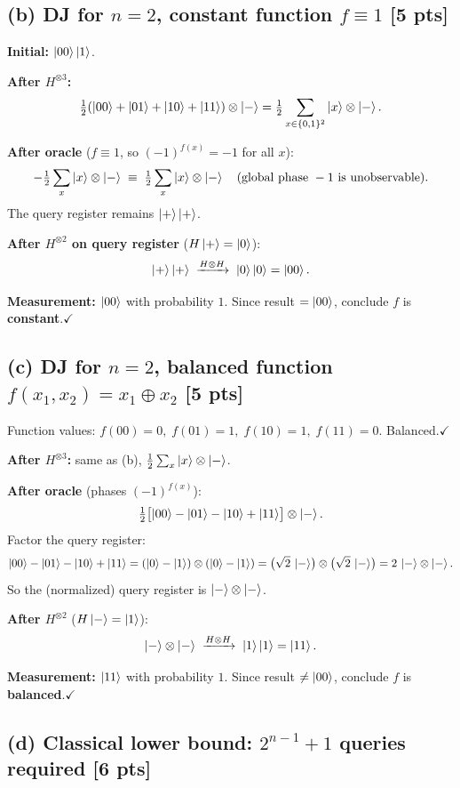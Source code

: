 \documentclass[11pt,a4paper]{article}
\begin{document}
\subsection*{(b) DJ for $n=2$, constant function $f\equiv1$ [5 pts]}

\textbf{Initial:} $\ket{00}\ket{1}$.

\textbf{After $H^{\otimes3}$:}
\[
\tfrac{1}{2}(\ket{00}+\ket{01}+\ket{10}+\ket{11})\otimes\ket{-}
=\tfrac{1}{2}\sum_{x\in\{0,1\}^2}\ket{x}\otimes\ket{-}.
\]

\textbf{After oracle} ($f\equiv1$, so $(-1)^{f(x)}=-1$ for all $x$):
\[
-\tfrac{1}{2}\sum_x\ket{x}\otimes\ket{-}\;\equiv\;\tfrac{1}{2}\sum_x\ket{x}\otimes\ket{-}
\quad(\text{global phase }-1\text{ is unobservable}).
\]
The query register remains $\ket{+}\ket{+}$.

\textbf{After $H^{\otimes2}$ on query register} ($H\ket{+}=\ket{0}$):
\[
\ket{+}\ket{+}\;\xrightarrow{H\otimes H}\;\ket{0}\ket{0}=\ket{00}.
\]

\textbf{Measurement:} $\ket{00}$ with probability $1$.\;
Since result $=\ket{00}$, conclude $f$ is \textbf{constant}.\;$\checkmark$

\subsection*{(c) DJ for $n=2$, balanced function $f(x_1,x_2)=x_1\oplus x_2$ [5 pts]}

Function values: $f(00)=0,\;f(01)=1,\;f(10)=1,\;f(11)=0$. Balanced.\;$\checkmark$

\textbf{After $H^{\otimes3}$:} same as (b), $\tfrac{1}{2}\sum_x\ket{x}\otimes\ket{-}$.

\textbf{After oracle} (phases $(-1)^{f(x)}$):
\[
\tfrac{1}{2}\bigl[\ket{00}-\ket{01}-\ket{10}+\ket{11}\bigr]\otimes\ket{-}.
\]
Factor the query register:
\[
\ket{00}-\ket{01}-\ket{10}+\ket{11}
=(\ket{0}-\ket{1})\otimes(\ket{0}-\ket{1})
=\bigl(\sqrt{2}\,\ket{-}\bigr)\otimes\bigl(\sqrt{2}\,\ket{-}\bigr)
=2\,\ket{-}\otimes\ket{-}.
\]
So the (normalized) query register is $\ket{-}\otimes\ket{-}$.

\textbf{After $H^{\otimes2}$} ($H\ket{-}=\ket{1}$):
\[
\ket{-}\otimes\ket{-}\;\xrightarrow{H\otimes H}\;\ket{1}\ket{1}=\ket{11}.
\]

\textbf{Measurement:} $\ket{11}$ with probability $1$.
Since result $\ne\ket{00}$, conclude $f$ is \textbf{balanced}.\;$\checkmark$

\subsection*{(d) Classical lower bound: $2^{n-1}+1$ queries required [6 pts]}
\end{document}
